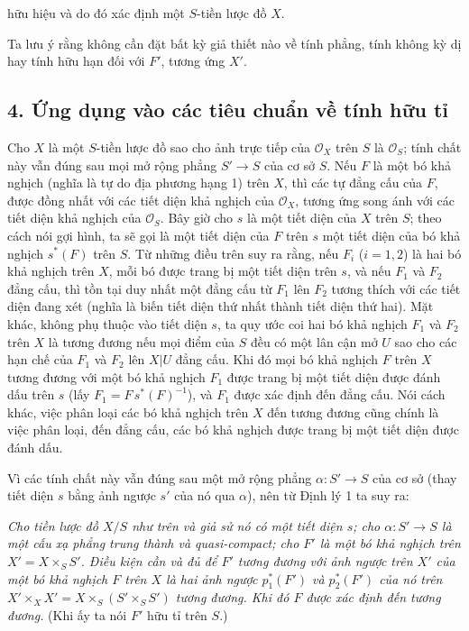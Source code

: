 \documentclass[11pt,twoside,openany]{book}
\numberwithin{equation}{section}
\newcommand{\src}[1]{%
  \phantomsection\hypertarget{src:\fgasourceid:#1}{}%
  \marginpar{\raggedleft\footnotesize\sffamily #1}%
}
\newcommand{\fgasourceid}{unset}
\begin{document}
\src{322}
hữu hiệu và do đó xác định một $S$-tiền lược đồ $X$.

Ta lưu ý rằng không cần đặt bất kỳ giả thiết nào về tính phẳng, tính không kỳ
dị hay tính hữu hạn đối với $F'$, tương ứng $X'$.

\subsection*{4. Ứng dụng vào các tiêu chuẩn về tính hữu tỉ}

Cho $X$ là một $S$-tiền lược đồ sao cho ảnh trực tiếp của $\mathcal O_X$ trên
$S$ là $\mathcal O_S$; tính chất này vẫn đúng sau mọi mở rộng phẳng
$S'\longrightarrow S$ của cơ sở $S$. Nếu $F$ là một bó khả nghịch (nghĩa là
tự do địa phương hạng 1) trên $X$, thì các tự đẳng cấu của $F$, được đồng nhất
với các tiết diện khả nghịch của $\mathcal O_X$, tương ứng song ánh với các
tiết diện khả nghịch của $\mathcal O_S$. Bây giờ cho $s$ là một tiết diện của
$X$ trên $S$; theo cách nói gợi hình, ta sẽ gọi là một tiết diện của $F$ trên
$s$ một tiết diện của bó khả nghịch $s^*(F)$ trên $S$. Từ những điều trên suy ra
rằng, nếu $F_i$ ($i=1,2$) là hai bó khả nghịch trên $X$, mỗi bó được trang bị
một tiết diện trên $s$, và nếu $F_1$ và $F_2$ đẳng cấu, thì tồn tại duy nhất
một đẳng cấu từ $F_1$ lên $F_2$ tương thích với các tiết diện đang xét (nghĩa
là biến tiết diện thứ nhất thành tiết diện thứ hai). Mặt khác, không phụ thuộc
vào tiết diện $s$, ta quy ước coi hai bó khả nghịch $F_1$ và $F_2$ trên $X$ là
tương đương nếu mọi điểm của $S$ đều có một lân cận mở $U$ sao cho các hạn chế
của $F_1$ và $F_2$ lên $X|U$ đẳng cấu. Khi đó mọi bó khả nghịch $F$ trên $X$
tương đương với một bó khả nghịch $F_1$ được trang bị một tiết diện được đánh
dấu trên $s$ (lấy $F_1=F\,s^*(F)^{-1}$), và $F_1$ được xác định đến đẳng cấu.
Nói cách khác, việc phân loại các bó khả nghịch trên $X$ đến tương đương cũng
chính là việc phân loại, đến đẳng cấu, các bó khả nghịch được trang bị một tiết
diện được đánh dấu.

Vì các tính chất này vẫn đúng sau một mở rộng phẳng
$\alpha:S'\longrightarrow S$ của cơ sở (thay tiết diện $s$ bằng ảnh ngược $s'$
của nó qua $\alpha$), nên từ Định lý 1 ta suy ra:

\emph{Cho tiền lược đồ $X/S$ như trên và giả sử nó có một tiết diện $s$; cho
$\alpha:S'\longrightarrow S$ là một cấu xạ phẳng trung thành và quasi-compact;
cho $F'$ là một bó khả nghịch trên $X'=X\times_SS'$. Điều kiện cần và đủ để
$F'$ tương đương với ảnh ngược trên $X'$ của một bó khả nghịch $F$ trên $X$ là
hai ảnh ngược $p_1^*(F')$ và $p_2^*(F')$ của nó trên
$X'\times_XX'=X\times_S(S'\times_SS')$ tương đương. Khi đó $F$ được xác định
đến tương đương.} (Khi ấy ta nói $F'$ hữu tỉ trên $S$.)
\end{document}
